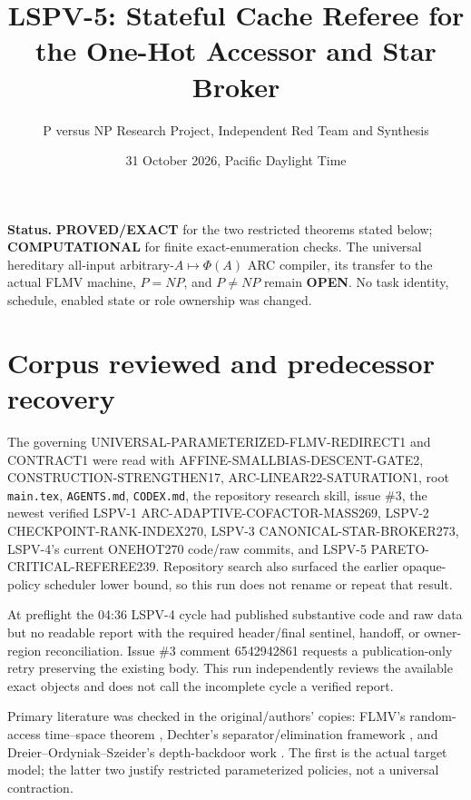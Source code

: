 \documentclass[11pt]{article}
\title{LSPV-5: Stateful Cache Referee for the One-Hot Accessor and Star Broker}
\author{P versus NP Research Project, Independent Red Team and Synthesis}
\date{31 October 2026, Pacific Daylight Time}
\begin{document}
\maketitle

\noindent\textbf{Status.}
\textbf{PROVED/EXACT} for the two restricted theorems stated below;
\textbf{COMPUTATIONAL} for finite exact-enumeration checks.
The universal hereditary all-input arbitrary-$A\mapsto\Phi(A)$ ARC compiler,
its transfer to the actual FLMV machine, $P=NP$, and $P\ne NP$ remain
\textbf{OPEN}.  No task identity, schedule, enabled state or role ownership was changed.

\section{Corpus reviewed and predecessor recovery}
The governing UNIVERSAL-PARAMETERIZED-FLMV-REDIRECT1 and CONTRACT1 were read
with AFFINE-SMALLBIAS-DESCENT-GATE2, CONSTRUCTION-STRENGTHEN17,
ARC-LINEAR22-SATURATION1, root \texttt{main.tex}, \texttt{AGENTS.md},
\texttt{CODEX.md}, the repository research skill, issue \#3, the newest verified
LSPV-1 ARC-ADAPTIVE-COFACTOR-MASS269, LSPV-2 CHECKPOINT-RANK-INDEX270,
LSPV-3 CANONICAL-STAR-BROKER273, LSPV-4's current ONEHOT270 code/raw commits,
and LSPV-5 PARETO-CRITICAL-REFEREE239.  Repository search also surfaced the
earlier opaque-policy scheduler lower bound, so this run does not rename or
repeat that result.

At preflight the 04:36 LSPV-4 cycle had published substantive code and raw
data but no readable report with the required header/final sentinel, handoff,
or owner-region reconciliation.  Issue \#3 comment 6542942861 requests a
publication-only retry preserving the existing body.  This run independently
reviews the available exact objects and does not call the incomplete cycle a
verified report.

Primary literature was checked in the original/authors' copies: FLMV's
random-access time--space theorem \cite{flmv}, Dechter's separator/elimination
framework \cite{dechter}, and Dreier--Ordyniak--Szeider's depth-backdoor work
\cite{dreier}.  The first is the actual target model; the latter two justify
restricted parameterized policies, not a universal contraction.
\end{document}
